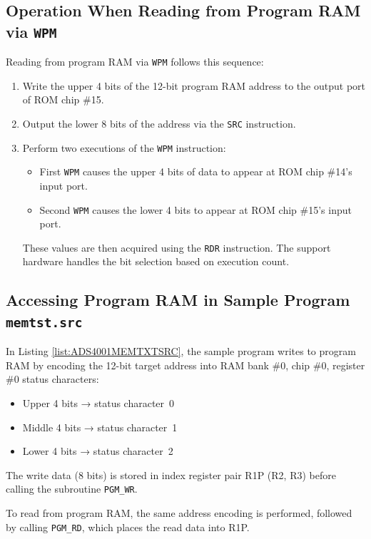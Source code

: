 \subsection{Operation When Reading from Program RAM via \texttt{WPM}}
Reading from program RAM via \texttt{WPM} follows this sequence:

\begin{enumerate}
  \item Write the upper 4 bits of the 12-bit program RAM address to the output port of ROM chip \#15.
  \item Output the lower 8 bits of the address via the \texttt{SRC} instruction.
  \item Perform two executions of the \texttt{WPM} instruction:
    \begin{itemize}
      \item First \texttt{WPM} causes the upper 4 bits of data to appear at ROM chip \#14's input port.
      \item Second \texttt{WPM} causes the lower 4 bits to appear at ROM chip \#15's input port.
    \end{itemize}
    These values are then acquired using the \texttt{RDR} instruction.  
    The support hardware handles the bit selection based on execution count.
\end{enumerate}

\subsection{Accessing Program RAM in Sample Program \texttt{memtst.src}}
In Listing \ref{list:ADS4001MEMTXTSRC}, the sample program writes to program RAM by encoding the 12-bit target address into RAM bank \#0, chip \#0, register \#0 status characters:
\begin{itemize}
  \item Upper 4 bits → status character~0
  \item Middle 4 bits → status character~1
  \item Lower 4 bits → status character~2
\end{itemize}
The write data (8 bits) is stored in index register pair R1P (R2, R3) before calling the subroutine \texttt{PGM\_WR}.

To read from program RAM, the same address encoding is performed, followed by calling \texttt{PGM\_RD}, which places the read data into R1P.

